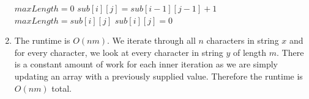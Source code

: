 \documentclass{article}
\begin{document}
\begin{enumerate}
\begin{algorithmic}
                \State $maxLength = 0$
                            \State $sub[i][j] = sub[i-1][j-1] + 1$
                                $maxLength = sub[i][j]$
                            \EndIf
                        \Else
                            \State $sub[i][j] = 0$
                        \EndIf
                    \EndFor
                \EndFor
            \EndFunction
        \end{algorithmic}
    \item The runtime is $O(nm)$. We iterate through all $n$ characters in string $x$ and for every character, we look at every character in string $y$ of length $m$.
            There is a constant amount of work for each inner iteration as we are simply updating an array with a previously supplied value. Therefore the runtime is $O(nm)$ total.

\end{enumerate}

\newpage
\end{document}
